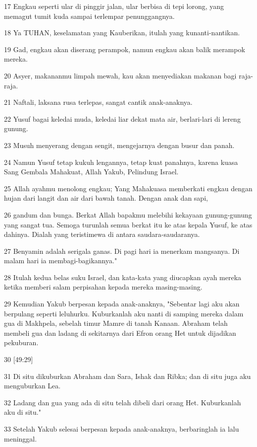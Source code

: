 \par 17 Engkau seperti ular di pinggir jalan, ular berbisa di tepi lorong, yang memagut tumit kuda sampai terlempar penunggangnya.
\par 18 Ya TUHAN, keselamatan yang Kauberikan, itulah yang kunanti-nantikan.
\par 19 Gad, engkau akan diserang perampok, namun engkau akan balik merampok mereka.
\par 20 Asyer, makananmu limpah mewah, kau akan menyediakan makanan bagi raja-raja.
\par 21 Naftali, laksana rusa terlepas, sangat cantik anak-anaknya.
\par 22 Yusuf bagai keledai muda, keledai liar dekat mata air, berlari-lari di lereng gunung.
\par 23 Musuh menyerang dengan sengit, mengejarnya dengan busur dan panah.
\par 24 Namun Yusuf tetap kukuh lengannya, tetap kuat panahnya, karena kuasa Sang Gembala Mahakuat, Allah Yakub, Pelindung Israel.
\par 25 Allah ayahmu menolong engkau; Yang Mahakuasa memberkati engkau dengan hujan dari langit dan air dari bawah tanah. Dengan anak dan sapi,
\par 26 gandum dan bunga. Berkat Allah bapakmu melebihi kekayaan gunung-gunung yang sangat tua. Semoga turunlah semua berkat itu ke atas kepala Yusuf, ke atas dahinya. Dialah yang teristimewa di antara saudara-saudaranya.
\par 27 Benyamin adalah serigala ganas. Di pagi hari ia menerkam mangsanya. Di malam hari ia membagi-bagikannya."
\par 28 Itulah kedua belas suku Israel, dan kata-kata yang diucapkan ayah mereka ketika memberi salam perpisahan kepada mereka masing-masing.
\par 29 Kemudian Yakub berpesan kepada anak-anaknya, "Sebentar lagi aku akan berpulang seperti leluhurku. Kuburkanlah aku nanti di samping mereka dalam gua di Makhpela, sebelah timur Mamre di tanah Kanaan. Abraham telah membeli gua dan ladang di sekitarnya dari Efron orang Het untuk dijadikan pekuburan.
\par 30 [49:29]
\par 31 Di situ dikuburkan Abraham dan Sara, Ishak dan Ribka; dan di situ juga aku menguburkan Lea.
\par 32 Ladang dan gua yang ada di situ telah dibeli dari orang Het. Kuburkanlah aku di situ."
\par 33 Setelah Yakub selesai berpesan kepada anak-anaknya, berbaringlah ia lalu meninggal.

